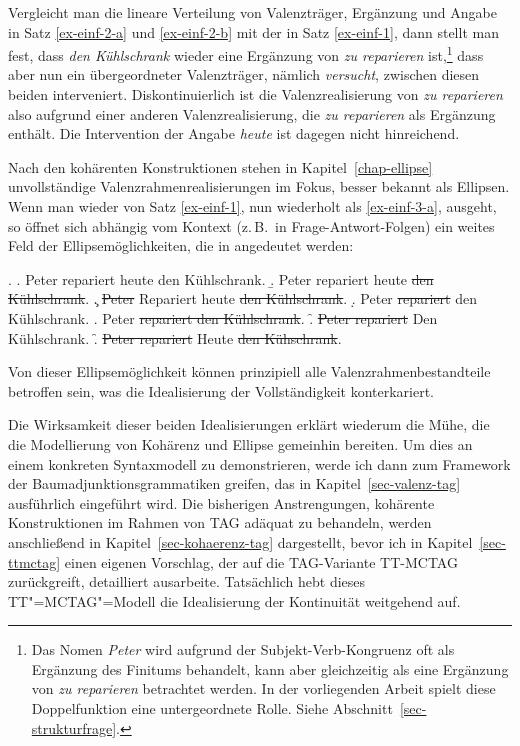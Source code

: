 Vergleicht man die lineare Verteilung von Valenzträger, Ergänzung und Angabe in Satz \ref{ex-einf-2-a} und \ref{ex-einf-2-b} mit der in Satz \ref{ex-einf-1}, dann stellt man fest, dass {\it den Kühlschrank} wieder eine Ergänzung von {\it zu reparieren} ist,\footnote{Das Nomen {\it Peter} wird aufgrund der Subjekt-Verb-Kongruenz oft als Ergänzung des Finitums behandelt, kann aber gleichzeitig als eine Ergänzung von {\it zu reparieren} betrachtet werden. In der vorliegenden Arbeit spielt diese Doppelfunktion eine untergeordnete Rolle. Siehe Abschnitt~\ref{sec-strukturfrage}.} dass aber nun ein übergeordneter Valenzträger, nämlich {\it versucht}, zwischen diesen beiden interveniert. Diskontinuierlich ist die Valenzrealisierung von \textit{zu reparieren} also aufgrund einer anderen Valenzrealisierung, die \textit{zu reparieren} als Ergänzung enthält. Die Intervention der Angabe \textit{heute} ist dagegen nicht hinreichend.

Nach den kohärenten Konstruktionen stehen in Kapitel~\ref{chap-ellipse} unvollständige Valenzrahmenrealisierungen im Fokus, besser bekannt als Ellipsen. Wenn man wieder von Satz \ref{ex-einf-1}, nun wiederholt als \ref{ex-einf-3-a}, ausgeht, so öffnet sich abhängig vom Kontext (z.\,B.\ in Frage-Antwort-Folgen) ein weites Feld der Ellipsemöglichkeiten, die in \Next[b--g] angedeutet werden:       
  
  \ex. \label{ex-einf-3}
  \a. \label{ex-einf-3-a} Peter repariert heute den Kühlschrank. 
  \b. \label{ex-einf-3-b} Peter repariert heute \sout{den Kühlschrank}.
  \c. \sout{Peter} Repariert heute \sout{den Kühlschrank}.
  \d. Peter \sout{repariert} den Kühlschrank.
  \e. Peter \sout{repariert den Kühlschrank}.
  \f. \sout{Peter repariert} Den Kühlschrank.
  \f. \label{ex-einf-3-f} \sout{Peter repariert} Heute \sout{den Kühschrank}.

Von dieser Ellipsemöglichkeit können prinzipiell alle Valenzrahmenbestandteile betroffen sein, was die Idealisierung der Vollständigkeit konterkariert.%
  
Die Wirksamkeit dieser beiden Idealisierungen erklärt wiederum die Mühe, die die Modellierung von Kohärenz und Ellipse gemeinhin bereiten. Um dies an einem konkreten Syntaxmodell zu demonstrieren, werde ich dann zum Framework der Baumadjunktionsgrammatiken greifen, das in Kapitel~\ref{sec-valenz-tag} ausführlich eingeführt wird. Die bisherigen Anstrengungen, kohärente Konstruktionen im Rahmen von TAG adäquat zu behandeln, werden anschlie\ss end in Kapitel~\ref{sec-kohaerenz-tag} dargestellt, bevor ich in Kapitel~\ref{sec-ttmctag} einen eigenen Vorschlag, der auf die TAG-Variante TT-MCTAG zurückgreift, detailliert ausarbeite. Tatsächlich hebt dieses TT"=MCTAG"=Modell die Idealisierung der Kontinuität weitgehend auf. 

